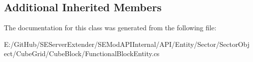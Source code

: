 \subsection*{Additional Inherited Members}


The documentation for this class was generated from the following file\+:\begin{DoxyCompactItemize}
\item 
E\+:/\+Git\+Hub/\+S\+E\+Server\+Extender/\+S\+E\+Mod\+A\+P\+I\+Internal/\+A\+P\+I/\+Entity/\+Sector/\+Sector\+Object/\+Cube\+Grid/\+Cube\+Block/Functional\+Block\+Entity.\+cs\end{DoxyCompactItemize}

